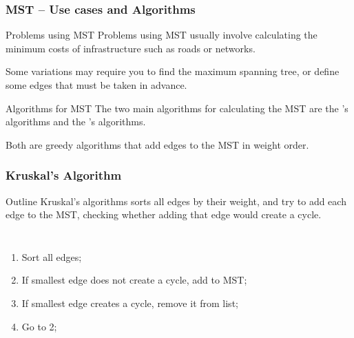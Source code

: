 \begin{frame}
  \frametitle{MST -- Use cases and Algorithms}
  {\small
  \begin{block}{Problems using MST}
    Problems using MST usually involve calculating the minimum costs
    of infrastructure such as roads or networks.

    \medskip

    Some variations may require you to find the \alert{maximum}
    spanning tree, or define some edges that \alert{must} be taken in advance.
  \end{block}

  \begin{exampleblock}{Algorithms for MST}
    The two main algorithms for calculating the MST are the
    's algorithms and the 's
    algorithms.

    \medskip

    Both are greedy algorithms that add edges to the MST in weight order.
  \end{exampleblock}
    }
\end{frame}

\begin{frame}
  \frametitle{Kruskal's Algorithm}
  \begin{block}{Outline}
    Kruskal's algorithms sorts all edges by their weight, and try to
    add each edge to the MST, checking whether adding that edge would
    create a cycle.
  \end{block}

  \begin{columns}[T]
    \begin{enumerate}
    \item Sort all edges;
    \item If smallest edge does not create a cycle, add to MST;
    \item If smallest edge creates a cycle, remove it from list;
    \item Go to 2;
    \end{enumerate}
  \end{columns}
\end{frame}

